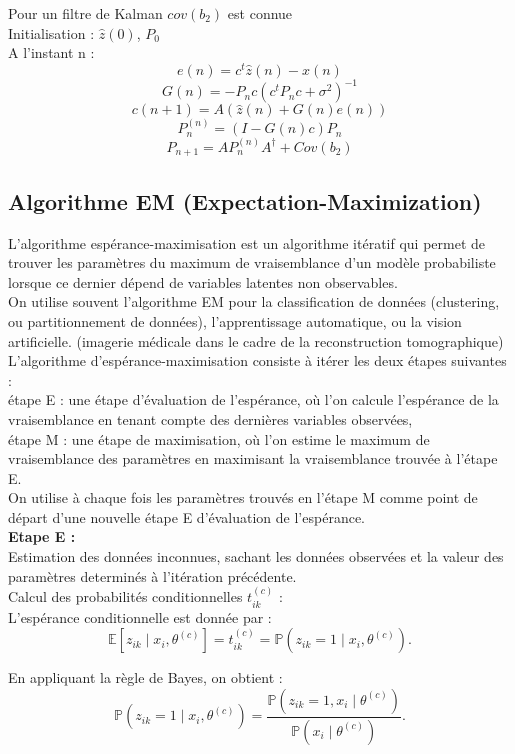 \documentclass[12pt]{article}
\begin{document}
Pour un filtre de Kalman $cov(b_2)$ est connue\\
Initialisation : $\hat{z}(0)$, $P_0$\\
A l'instant n : $$e(n) = c^t \hat{z}(n) - x(n)$$
$$G(n)=-P_n c(c^t P_n c + \sigma^2)^{-1} $$
$$c(n+1) = A(\hat{z}(n) + G(n) e(n))$$
$$P_n^{(n)} = (I-G(n)c)P_n$$
$$P_{n+1} = AP_n^{(n)} A^\dag + Cov(b_2)$$

\newpage
\subsection{Algorithme EM (Expectation-Maximization)}
L'algorithme espérance-maximisation est un algorithme itératif qui permet de trouver les paramètres du maximum de vraisemblance d'un modèle probabiliste lorsque ce dernier dépend de variables latentes non observables.\\
On utilise souvent l'algorithme EM pour la classification de données (clustering, ou partitionnement de données), l'apprentissage automatique, ou la vision artificielle. (imagerie médicale dans le cadre de la reconstruction tomographique)\\

L'algorithme d'espérance-maximisation consiste à itérer les deux étapes suivantes : \\
étape E : une étape d'évaluation de l'espérance, où l'on calcule l'espérance de la vraisemblance en tenant compte des dernières variables observées,\\
étape M : une étape de maximisation, où l'on estime le maximum de vraisemblance des paramètres en maximisant la vraisemblance trouvée à l'étape E.\\
On utilise à chaque fois les paramètres trouvés en l'étape M comme point de départ d'une nouvelle étape E d'évaluation de l'espérance.\\

\textbf{Etape E :}\\
Estimation des données inconnues, sachant les données observées et la valeur des paramètres determinés à l’itération précédente.\\
Calcul des probabilités conditionnelles $t_{ik}^{(c)}$ :\\

L'espérance conditionnelle est donnée par :
\[
\mathbb{E}[z_{ik} \mid x_i, \theta^{(c)}] = t_{ik}^{(c)} = \mathbb{P}(z_{ik} = 1 \mid x_i, \theta^{(c)}).
\]

En appliquant la règle de Bayes, on obtient :
\[
\mathbb{P}(z_{ik} = 1 \mid x_i, \theta^{(c)}) = \frac{\mathbb{P}(z_{ik} = 1, x_i \mid \theta^{(c)})}{\mathbb{P}(x_i \mid \theta^{(c)})}.
\]
\end{document}

